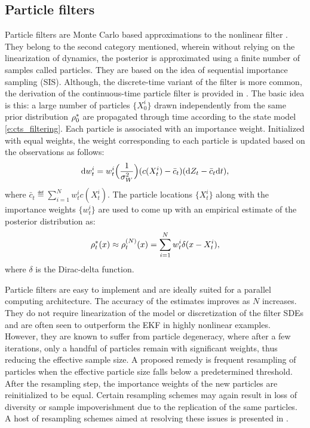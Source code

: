 \subsection{Particle filters}
\label{e:particle}
Particle filters are Monte Carlo based approximations to the nonlinear filter \cite{doucet2000sequential}.  They belong to the second category mentioned, wherein without relying on the linearization of dynamics, the posterior is approximated using a finite number of samples called particles. They are based on the idea of sequential importance sampling (SIS). Although, the discrete-time variant of the filter is more common, the derivation of the continuous-time particle filter is provided in \cite{kutsurpfi19}. The basic idea is this: a large number of particles $\{X^i_0\}$ drawn independently from the same prior distribution $\rho^*_0$ are propagated through time according to the state model \eqref{e:cts_filtering}. Each particle is associated with an importance weight. Initialized with equal weights, the weight corresponding to each particle is updated based on the observations as follows:
\begin{equation}
\ud w^i_t = w^i_t  \Bigl(\frac{1}{\sigma^2_W} \Bigr) (c(X^i_t)  - \bar{c}_t ) (\ud Z_t - \bar{c}_t \ud t),
\label{e:particle_wt}
\end{equation}
where $\bar{c}_t \eqdef \sum_{i=1}^N w^i_t c(X^i_t)$. The particle locations $\{X^i_t\}$ along with the importance weights $\{w^i_t\}$ are used to come up with an empirical estimate of the posterior distribution as:
\begin{equation}
\pr^*_t(x) \approx \pr^{(N)}_t(x) = \sum_{i=1}^N w^i_t \delta(x -X^i_t),
\label{e:particle_empirical}
\end{equation}
where $\delta$ is the Dirac-delta function. 

Particle filters are easy to implement and are ideally suited for a parallel computing architecture. The accuracy of the estimates improves as $N$ increases. They do not require linearization of the model or discretization of the filter SDEs and are often seen to outperform the EKF in highly nonlinear examples. However, they are known to suffer from particle degeneracy, where after a few iterations, only a handful of particles remain with significant weights, thus reducing the effective sample size. A proposed remedy is frequent resampling of particles when the effective particle size falls below a predetermined threshold. After the resampling step, the importance weights of the new particles are reinitialized to be equal. Certain resampling schemes may again result in loss of diversity or sample impoverishment due to the replication of the same particles. A host of resampling schemes aimed at resolving these issues is presented in \cite{budchelee07, arumasgorcla02}.
 
